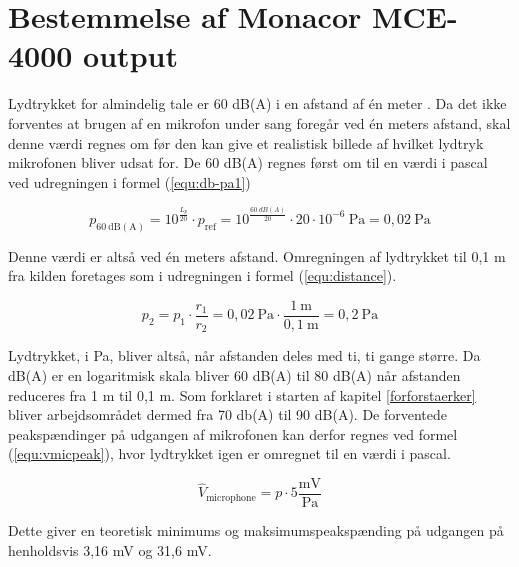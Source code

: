 \chapter{Bestemmelse af Monacor MCE-4000 output}
\label{bestemmelse-af-monacor-mce-4000-output}
Lydtrykket for almindelig tale er 60 dB(A) i en afstand af én meter \cite{lidt_om_lyd}. Da det ikke forventes at brugen af en mikrofon under sang foregår ved én meters  afstand, skal denne værdi regnes om før den kan give et realistisk billede af hvilket lydtryk mikrofonen bliver udsat for. De 60 dB(A) regnes først om til en værdi i pascal ved udregningen i formel (\ref{equ:db-pa1})

\begin{equation}
\label{equ:db-pa1}
p_{\mathrm{60~dB(A)}} = 10^{\frac{L_p}{20}} \cdot p_{\mathrm{ref}} = 10^{\frac{60~dB(A)}{20}} \cdot 20 \cdot 10^{-6}~\mathrm{Pa} = 0,02~\mathrm{Pa}
\end{equation}

Denne værdi er altså ved én meters afstand. Omregningen af lydtrykket til 0,1 m fra kilden foretages som i udregningen i formel (\ref{equ:distance}).

\begin{equation}
\label{equ:distance}
p_2 = p_1 \cdot \frac{r_1}{r_2} = 0,02~\mathrm{Pa} \cdot \frac{1~\mathrm{m}}{0,1~\mathrm{m}} = 0,2~\mathrm{Pa}
\end{equation}

Lydtrykket, i Pa, bliver altså, når afstanden deles med ti, ti gange større. Da dB(A) er en logaritmisk skala bliver 60 dB(A) til 80 dB(A) når afstanden reduceres fra 1 m til 0,1 m. Som forklaret i starten af kapitel \ref{forforstaerker} bliver arbejdsområdet dermed fra 70 db(A) til 90 dB(A). De forventede peakspændinger på udgangen af mikrofonen kan derfor regnes ved formel (\ref{equ:vmicpeak}), hvor lydtrykket igen er omregnet til en værdi i pascal.

\begin{equation}
\label{equ:vmicpeak}
\hat{V}_{\mathrm{microphone}} = p \cdot 5\frac{\mathrm{mV}}{\mathrm{Pa}}
\end{equation}

Dette giver en teoretisk minimums og maksimumspeakspænding på udgangen på henholdsvis 3,16 mV og 31,6 mV.